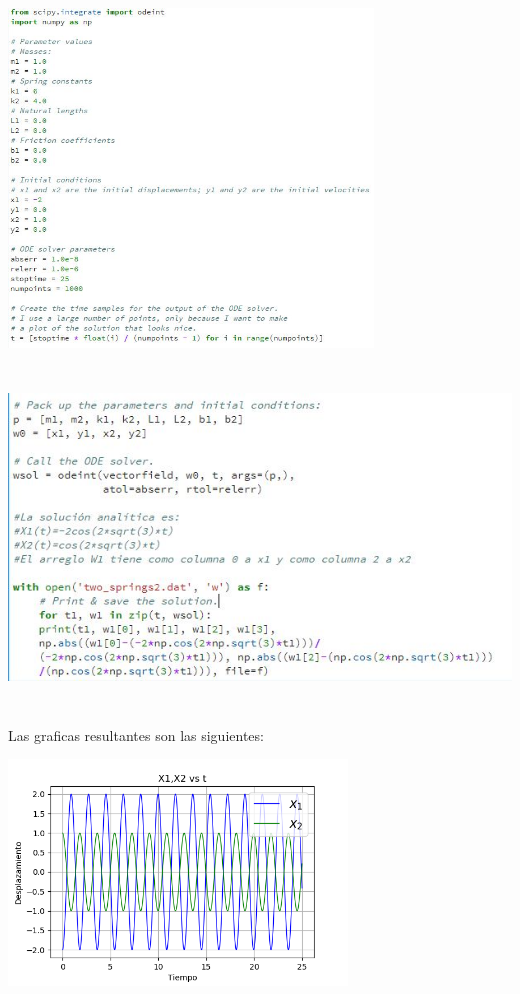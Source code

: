 \documentclass{article}
\begin{document}
\begin{center}
\includegraphics[height=9cm]{cod4.png}
\end{center}

\begin{center}
\includegraphics[height=9cm]{cod4_1.png}
\end{center}

\vspace{0.5cm}

Las graficas resultantes son las siguientes:

\begin{center}
\includegraphics[height=6cm]{resortes2_2_1.png}
\end{center}
\end{document}
